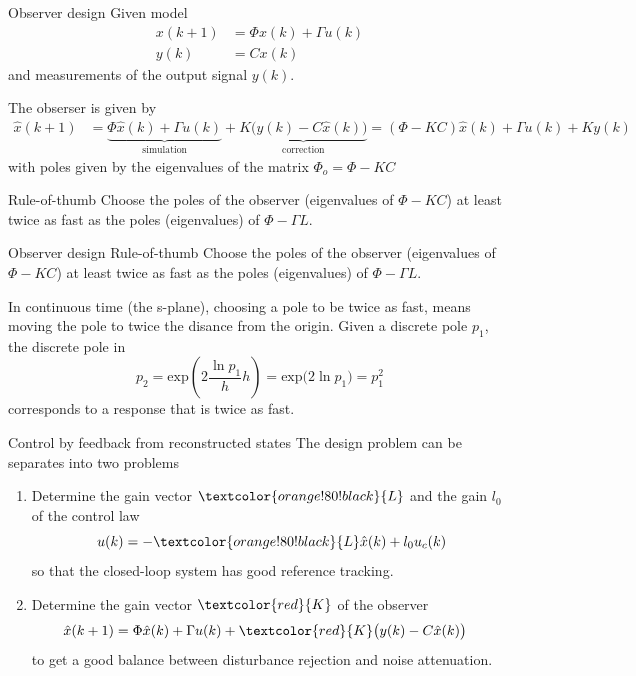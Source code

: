 \documentclass[presentation,aspectratio=1610]{beamer}
\begin{document}
\begin{frame}[label={sec:org71af002}]{Observer design}
Given model
 \begin{equation*}
 \begin{split}
  x(k+1) &= \Phi x(k) + \Gamma u(k)\\
  y(k) &= C x(k)
 \end{split}
 \label{eq:ssmodel}
\end{equation*}
and measurements of the output signal \(y(k)\). 

The obserser is given by
\begin{equation*}
\begin{split}
\hat{x}(k+1) &= \underbrace{\Phi \hat{x}(k) + \Gamma u(k)}_{\text{simulation}} + \underbrace{K\big(y(k) - C\hat{x}(k)\big)}_{\text{correction}} = \left(\Phi - KC\right)\hat{x}(k) +  \Gamma u(k) + Ky(k)
\end{split}
\end{equation*}
with poles given by the eigenvalues of the matrix \(\Phi_o = \Phi - KC\)

\alert{Rule-of-thumb} Choose the poles of the observer (eigenvalues of \(\Phi-KC\)) at least twice as fast as the poles (eigenvalues) of \(\Phi-\Gamma L\).
\end{frame}

\begin{frame}[label={sec:org8c2ca3d}]{Observer design}
\alert{Rule-of-thumb} Choose the poles of the observer (eigenvalues of \(\Phi-KC\)) at least twice as fast as the poles (eigenvalues) of \(\Phi-\Gamma L\).

In continuous time (the s-plane), choosing a pole to be twice as fast, means moving the pole to twice the disance from the origin. Given a discrete pole \(p_1\), the discrete pole in 
\[ p_2 = \text{exp}\left( 2 \frac{\ln p_1}{h} h\right) = \text{exp} \big( 2 \ln p_1 \big) = p_1^2\]
corresponds to a response that is twice as fast.
\end{frame}

\begin{frame}[label={sec:org71f4946}]{Control by feedback from reconstructed states}
The design problem can be separates into two problems
\begin{enumerate}
\item Determine the gain vector \(\textcolor{orange!80!black}{L}\) and the gain \(l_0\) of the control law
\[ u(k) = -\textcolor{orange!80!black}{L} \hat{x}(k) + l_0 u_c(k)\]
so that the closed-loop system has good reference tracking.
\item Determine the gain vector \(\textcolor{red}{K}\) of the observer
\begin{equation*}
\begin{split}
\hat{x}(k+1) &= \Phi \hat{x}(k) + \Gamma u(k) + \textcolor{red}{K} \big(y(k) - C\hat{x}(k)\big)
\end{split}
\end{equation*}
to get a good balance between disturbance rejection and noise attenuation.
\end{enumerate}
\end{frame}
\end{document}
